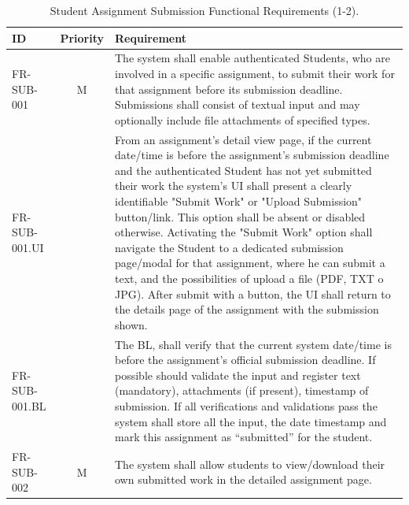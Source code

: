 \begin{table}[h]
    \centering
    \begin{tabular}{|l|c|p{10cm}|}
        \hline
        \textbf{ID} & \textbf{Priority} & \textbf{Requirement} \\
        \hline
        FR-SUB-001 & M & The system shall enable authenticated Students, who are involved in a specific assignment, to submit their work for that assignment before its submission deadline. Submissions shall consist of textual input and may optionally include file attachments of specified types. \\
        \quad FR-SUB-001.UI &  & \quad From an assignment's detail view page, if the current date/time is before the assignment's submission deadline and the authenticated Student has not yet submitted their work the system's UI shall present a clearly identifiable "Submit Work" or "Upload Submission" button/link. This option shall be absent or disabled otherwise. Activating the "Submit Work" option shall navigate the Student to a dedicated submission page/modal for that assignment, where he can submit a text, and the possibilities of upload a file (PDF, TXT o JPG). After submit with a button, the UI shall return to the details page of the assignment with the submission shown. \\
        \quad FR-SUB-001.BL &  & \quad The BL, shall verify that the current system date/time is before the assignment's official submission deadline. If possible should validate the input and register text (mandatory), attachments (if present), timestamp of submission. If all verifications and validations pass the system shall store all the input, the date timestamp and mark this assignment as “submitted” for the student. \\
        \hline
        FR-SUB-002 & M & The system shall allow students to view/download their own submitted work in the detailed assignment page. \\
        \hline
    \end{tabular}
    \caption{Student Assignment Submission Functional Requirements (1-2).}
    \label{tab:StudentAssignmentSubmissionFR}
\end{table}

\vspace*{\fill}
\clearpage
\vspace*{\fill}

